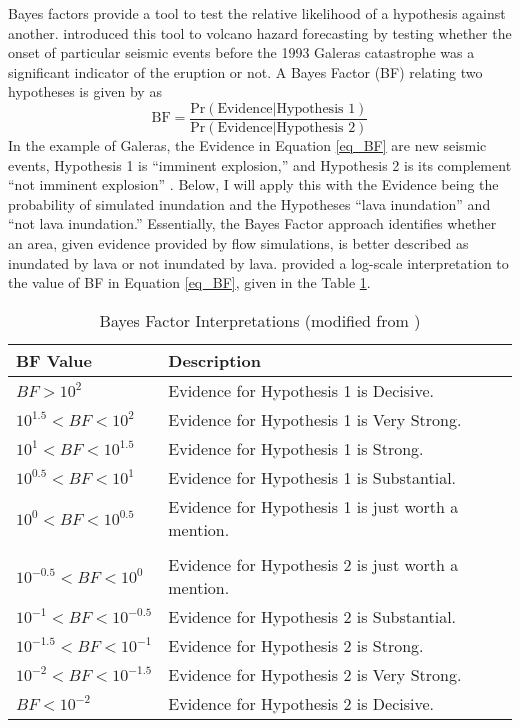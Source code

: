 	Bayes factors provide a tool to test the relative likelihood of a hypothesis against another. \citet{aspinall2003evidence} introduced this tool to volcano hazard forecasting by testing whether the onset of particular seismic events before the 1993 Galeras catastrophe was a significant indicator of the eruption or not. A Bayes Factor (BF) relating two hypotheses is given by \citet{jeffreys1998theory} as
	\begin{equation}
		\text{BF} = \frac{\text{Pr}(\text{Evidence}|\text{Hypothesis~1})}{\text{Pr}(\text{Evidence}|\text{Hypothesis~2})}
		\label{eq_BF}
	\end{equation}
	In the example of Galeras, the Evidence in Equation \ref{eq_BF} are new seismic events, Hypothesis 1 is ``imminent explosion,'' and Hypothesis 2 is its complement ``not imminent explosion'' \citep{aspinall2003evidence}. Below, I will apply this with the Evidence being the probability of simulated inundation and the Hypotheses ``lava inundation'' and ``not lava inundation.'' Essentially, the Bayes Factor approach identifies whether an area, given evidence provided by flow simulations, is better described as inundated by lava or not inundated by lava. \citet{jeffreys1998theory} provided a log-scale interpretation to the value of BF in Equation \ref{eq_BF}, given in the Table \ref{tab_BFinterps}.
	
	\begin{table}[h]
		\centering
		\caption{Bayes Factor Interpretations (modified from \citet{aspinall2003evidence})}
		\begin{tabular}{l l}
			\toprule
			BF Value & Description\\
			\midrule
			$BF>10^2$ & Evidence for Hypothesis 1 is Decisive.\\
			$10^{1.5}<BF<10^2$ & Evidence for Hypothesis 1 is Very Strong.\\
			$10^{1}<BF<10^{1.5}$ & Evidence for Hypothesis 1 is Strong.\\
			$10^{0.5}<BF<10^{1}$ & Evidence for Hypothesis 1 is Substantial.\\
			$10^{0}<BF<10^{0.5}$ & Evidence for Hypothesis 1 is just worth a mention.\\\\
			$10^{-0.5}<BF<10^{0}$ & Evidence for Hypothesis 2 is just worth a mention.\\
			$10^{-1}<BF<10^{-0.5}$ & Evidence for Hypothesis 2 is Substantial.\\
			$10^{-1.5}<BF<10^{-1}$ & Evidence for Hypothesis 2 is Strong.\\
			$10^{-2}<BF<10^{-1.5}$ & Evidence for Hypothesis 2 is Very Strong.\\
			$BF<10^{-2}$ & Evidence for Hypothesis 2 is Decisive.\\
			\bottomrule
		\end{tabular}
		\label{tab_BFinterps}
	\end{table}
	
